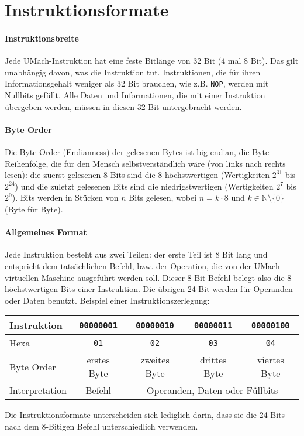 \section{Instruktionsformate}

\paragraph{Instruktionsbreite}
Jede UMach-Instruktion hat eine feste Bitlänge von 32 Bit (4 mal 8 Bit).
Das gilt unabhängig davon, was die Instruktion tut. Instruktionen, die für ihren
Informationsgehalt weniger als 32 Bit brauchen, wie z.B. \texttt{NOP},
werden mit Nullbits gefüllt. Alle Daten und Informationen, die mit einer
Instruktion übergeben werden, müssen in diesen 32 Bit untergebracht werden.

\paragraph{Byte Order}
Die Byte Order (Endianness) der gelesenen \glspl{Byte} ist
big-endian, die Byte-Reihenfolge, die für den Mensch selbstverständlich wäre
(von links nach rechts lesen):
die zuerst gelesenen 8 Bits sind die 8 höchstwertigen (Wertigkeiten $2^{31}$ bis
$2^{24}$) und die zuletzt gelesenen Bits sind die niedrigstwertigen
(Wertigkeiten $2^{7}$ bis $2^{0}$).
Bits werden in Stücken von $n$ Bits gelesen, wobei $n = k \cdot 8$ und
$k \in \mathbb{N} \setminus\{0\}$ (Byte für Byte).


\paragraph{Allgemeines Format}
Jede \gls{Instruktion} besteht aus zwei Teilen: der erste Teil ist
8 Bit lang und entspricht dem tatsächlichen \gls{Befehl}, bzw. der Operation,
die von der UMach virtuellen Maschine ausgeführt werden soll.
Dieser 8-Bit-Befehl belegt also die 8 höchstwertigen Bits einer Instruktion.
Die übrigen 24 Bit werden für Operanden oder Daten benutzt. Beispiel einer
Instruktionszerlegung:

\begin{center}
  \begin{tabular}{|l|*{4}{c|}}
    \hline
    Instruktion &
    \texttt{00000001} & \texttt{00000010} & \texttt{00000011} & \texttt{00000100}
    \\\hline
    Hexa  &
    \texttt{01}   & \texttt{02}   & \texttt{03}   & \texttt{04}
    \\\hline
    Byte Order &
    erstes Byte   & zweites Byte  & drittes Byte  & viertes Byte
    \\\hline
    Interpretation &
    Befehl    &  \multicolumn{3}{c|}{Operanden, Daten oder Füllbits}
    \\\hline
  \end{tabular}
\end{center}

Die Instruktionsformate unterscheiden sich lediglich darin, dass sie die 24 Bits
nach dem 8-Bitigen \gls{Befehl} unterschiedlich verwenden.

